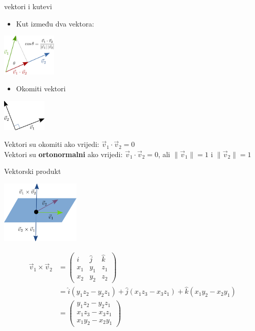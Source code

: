 \documentclass[9pt]{beamer}
\begin{document}
\begin{frame}{vektori i kutevi}
	\begin{itemize}
		\item Kut između dva vektora:
	\end{itemize}
	\begin{center}
		\includegraphics[height=2cm]{./slike/linear_algebra_vector_angle.png}
	\end{center}
	\begin{itemize}
		\item Okomiti vektori
	\end{itemize}
	\begin{center}
		\includegraphics[height=1.5cm]{./slike/linear_algebra_vector_orthogonal.png}
	\end{center}
	Vektori su okomiti ako vrijedi: $\vec{v}_1 \cdot \vec{v}_2 = 0$ \\
	Vektori su \textbf{ortonormalni} ako vrijedi:  $\vec{v}_1 \cdot \vec{v}_2 = 0$, ali $\lVert\vec{v}_1 \rVert = 1$ i $\lVert\vec{v}_2 \rVert = 1$
\end{frame}

\begin{frame}{Vektorski produkt}
	\begin{center}
		\includegraphics[height=3cm]{./slike/linear_algebra_cross_product.png}
	\end{center}
	\begin{align*}
	\vec{v}_1 \times \vec{v}_2 &= \begin{pmatrix}
	\hat{i} & \hat{j} & \hat{k} \\
	x_1 & y_1 & z_1 \\
	x_2 & y_2 & z_2
	\end{pmatrix} \\
	& = \hat{i}(y_1z_2 - y_2z_1) + \hat{j}(x_1z_3 - x_3z_1) + \hat{k}(x_1y_2 - x_2y_1) \\
	& =  \begin{pmatrix}
	y_1z_2 - y_2z_1 \\
	x_1z_3 - x_3z_1 \\
	x_1y_2 - x_2y_1
	\end{pmatrix}
	\end{align*}
\end{frame}
\end{document}
